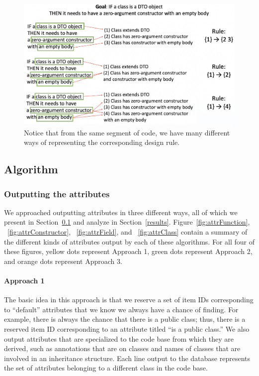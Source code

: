 \documentclass[12pt]{article}
\begin{document}
\begin{figure}
  \includegraphics[width=\linewidth]{designRuleEx.png}
  \caption{Notice that from the same segment of code, we have many different ways of representing the corresponding design rule.}
  \label{fig:drEx}
\end{figure}





\subsection{Algorithm} \label{algm}

\subsubsection{Outputting the attributes}\label{algm_attrApproaches}

We approached outputting attributes in three different ways, all of which we present in Section~\ref{algm} and analyze in Section~\ref{results}. Figure~\ref{fig:attrFunction}, ~\ref{fig:attrConstructor}, ~\ref{fig:attrField}, and ~\ref{fig:attrClass} contain a summary of the different kinds of attributes output by each of these algorithms. For all four of these figures, yellow dots represent Approach 1, green dots represent Approach 2, and orange dots represent Approach 3.

	\paragraph{Approach 1}
	
	The basic idea in this approach is that we reserve a set of item IDs corresponding to “default” attributes that we know we always have a chance of finding. For example, there is always the chance that there is a public class; thus, there is a reserved item ID corresponding to an attribute titled “is a public class.” We also output attributes that are specialized to the code base from which they are derived, such as annotations that are on classes and names of classes that are involved in an inheritance structure. Each line output to the database represents the set of attributes belonging to a different class in the code base.
\end{document}
